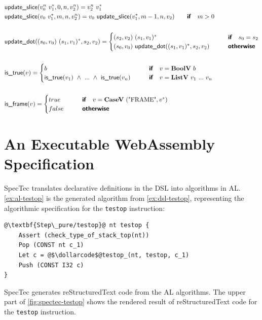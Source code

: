 \begin{align*}
  &\updateslice(v_0^n ~ \seq{v_1}, 0, n, v_2^n) = v_2^n ~ \seq{v_1} \\
  &\updateslice(v_0 ~ \seq{v_1}, m, n, v_2^n) =  v_0 ~ \updateslice(\seq{v_1}, m-1, n, v_2)
  \quad\quad\premise{if}\quad m > 0 \\
%
\newline \\
  &\updatedot((s_0, v_0) ~ \seq{(s_1, v_1)}, s_2, v_2) =
  \begin{cases}
    (s_2, v_2) ~ \seq{(s_1, v_1)}
    &\quad\quad\premise{if}\quad s_0 = s_2 \\
    (s_0, v_0) ~ \updatedot(\seq{(s_1, v_1)}, s_2, v_2)
    &\quad\quad\premise{otherwise}
  \end{cases}
  \\
%
\newline \\
  &\istrue(v) =
  \begin{cases}
  b &\quad\quad\premise{if}\quad v = \boolv ~ b \\
    \istrue(v_1) ~ \land ~ ... ~ \land ~ \istrue(v_n) &\quad\quad\premise{if}\quad
    v = \listv ~ v_1 ~ ... ~ v_n \\
  \end{cases} \\
%
\newline \\
  &\isframe(v) =
  \begin{cases}
    true
    &\quad\quad\premise{if}\quad v = \casev ~ (\text{"FRAME"}, \seq v) \\
    false &\quad\quad\premise{otherwise}\\
  \end{cases}
  \\
\end{align*}




\section{An Executable WebAssembly Specification}
\label{sec:exec-spec}

SpecTec translates declarative definitions in the DSL into algorithms in AL.
\cref{ex:al-testop} is the generated algorithm from \cref{ex:dsl-testop},
representing the algorithmic specification for the \texttt{testop} instruction:
\\
\begin{example}
\begin{lstlisting}[style=al]
@\textbf{Step\_pure/testop}@ nt testop {
    Assert (check_type_of_stack_top(nt))
    Pop (CONST nt c_1)
    Let c = @$\dollarcode$@testop_(nt, testop, c_1)
    Push (CONST I32 c)
}
\end{lstlisting}
  \label{ex:al-testop}
\end{example}
SpecTec generates reStructuredText code from the AL algorithms.
The upper part of \cref{fig:spectec-testop} shows the rendered result of
reStructuredText code for the \texttt{testop} instruction.


